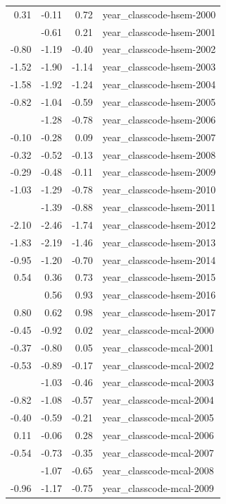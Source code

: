 \documentclass[]{article}
\begin{document}
\begin{longtable}[t]{rrrl}
0.31 & -0.11 & 0.72 & year\_classcode-hsem-2000\\
\addlinespace
-0.20 & -0.61 & 0.21 & year\_classcode-hsem-2001\\
-0.80 & -1.19 & -0.40 & year\_classcode-hsem-2002\\
-1.52 & -1.90 & -1.14 & year\_classcode-hsem-2003\\
-1.58 & -1.92 & -1.24 & year\_classcode-hsem-2004\\
-0.82 & -1.04 & -0.59 & year\_classcode-hsem-2005\\
\addlinespace
-1.03 & -1.28 & -0.78 & year\_classcode-hsem-2006\\
-0.10 & -0.28 & 0.09 & year\_classcode-hsem-2007\\
-0.32 & -0.52 & -0.13 & year\_classcode-hsem-2008\\
-0.29 & -0.48 & -0.11 & year\_classcode-hsem-2009\\
-1.03 & -1.29 & -0.78 & year\_classcode-hsem-2010\\
\addlinespace
-1.13 & -1.39 & -0.88 & year\_classcode-hsem-2011\\
-2.10 & -2.46 & -1.74 & year\_classcode-hsem-2012\\
-1.83 & -2.19 & -1.46 & year\_classcode-hsem-2013\\
-0.95 & -1.20 & -0.70 & year\_classcode-hsem-2014\\
0.54 & 0.36 & 0.73 & year\_classcode-hsem-2015\\
\addlinespace
0.75 & 0.56 & 0.93 & year\_classcode-hsem-2016\\
0.80 & 0.62 & 0.98 & year\_classcode-hsem-2017\\
-0.45 & -0.92 & 0.02 & year\_classcode-mcal-2000\\
-0.37 & -0.80 & 0.05 & year\_classcode-mcal-2001\\
-0.53 & -0.89 & -0.17 & year\_classcode-mcal-2002\\
\addlinespace
-0.74 & -1.03 & -0.46 & year\_classcode-mcal-2003\\
-0.82 & -1.08 & -0.57 & year\_classcode-mcal-2004\\
-0.40 & -0.59 & -0.21 & year\_classcode-mcal-2005\\
0.11 & -0.06 & 0.28 & year\_classcode-mcal-2006\\
-0.54 & -0.73 & -0.35 & year\_classcode-mcal-2007\\
\addlinespace
-0.86 & -1.07 & -0.65 & year\_classcode-mcal-2008\\
-0.96 & -1.17 & -0.75 & year\_classcode-mcal-2009\\

\end{longtable}
\end{document}
